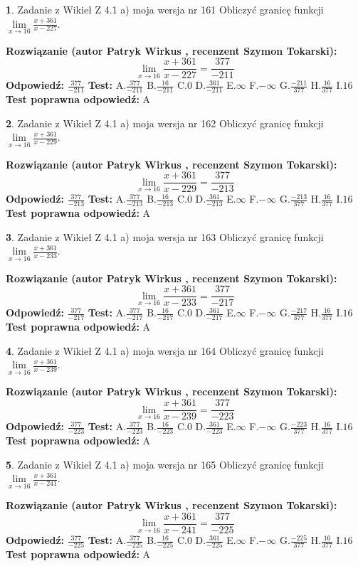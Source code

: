 \documentclass[12pt, a4paper]{article}
\theoremstyle{definition} %
\newtheorem{zad}{}
\newcommand{\zadStart}[1]{\begin{zad}#1\newline}
\newcommand{\zadStop}{\end{zad}}
\newcommand{\rozwStart}[2]{\noindent \textbf{Rozwiązanie (autor #1 , recenzent #2): }\newline}
\newcommand{\rozwStop}{\newline}
\newcommand{\odpStart}{\noindent \textbf{Odpowiedź:}\newline}
\newcommand{\odpStop}{\newline}
\newcommand{\testStart}{\noindent \textbf{Test:}\newline}
\newcommand{\testStop}{\newline}
\newcommand{\kluczStart}{\noindent \textbf{Test poprawna odpowiedź:}\newline}
\newcommand{\kluczStop}{\newline}
\begin{document}
\zadStart{Zadanie z Wikieł Z 4.1 a) moja wersja nr 161}
Obliczyć granicę funkcji $\lim\limits_{x\to16}\frac{x+361}{x-227}$.
\zadStop
\rozwStart{Patryk Wirkus}{Szymon Tokarski}
$$\lim\limits_{x\to16}\frac{x+361}{x-227} = \frac{377}{-211}$$
\rozwStop
\odpStart
$\frac{377}{-211}$
\odpStop
\testStart
A.$\frac{377}{-211}$
B.$\frac{16}{-211}$
C.$0$
D.$\frac{361}{-211}$
E.$\infty$
F.$-\infty$
G.$\frac{-211}{377}$
H.$\frac{16}{377}$
I.$16$
\testStop
\kluczStart
A
\kluczStop



\zadStart{Zadanie z Wikieł Z 4.1 a) moja wersja nr 162}
Obliczyć granicę funkcji $\lim\limits_{x\to16}\frac{x+361}{x-229}$.
\zadStop
\rozwStart{Patryk Wirkus}{Szymon Tokarski}
$$\lim\limits_{x\to16}\frac{x+361}{x-229} = \frac{377}{-213}$$
\rozwStop
\odpStart
$\frac{377}{-213}$
\odpStop
\testStart
A.$\frac{377}{-213}$
B.$\frac{16}{-213}$
C.$0$
D.$\frac{361}{-213}$
E.$\infty$
F.$-\infty$
G.$\frac{-213}{377}$
H.$\frac{16}{377}$
I.$16$
\testStop
\kluczStart
A
\kluczStop



\zadStart{Zadanie z Wikieł Z 4.1 a) moja wersja nr 163}
Obliczyć granicę funkcji $\lim\limits_{x\to16}\frac{x+361}{x-233}$.
\zadStop
\rozwStart{Patryk Wirkus}{Szymon Tokarski}
$$\lim\limits_{x\to16}\frac{x+361}{x-233} = \frac{377}{-217}$$
\rozwStop
\odpStart
$\frac{377}{-217}$
\odpStop
\testStart
A.$\frac{377}{-217}$
B.$\frac{16}{-217}$
C.$0$
D.$\frac{361}{-217}$
E.$\infty$
F.$-\infty$
G.$\frac{-217}{377}$
H.$\frac{16}{377}$
I.$16$
\testStop
\kluczStart
A
\kluczStop



\zadStart{Zadanie z Wikieł Z 4.1 a) moja wersja nr 164}
Obliczyć granicę funkcji $\lim\limits_{x\to16}\frac{x+361}{x-239}$.
\zadStop
\rozwStart{Patryk Wirkus}{Szymon Tokarski}
$$\lim\limits_{x\to16}\frac{x+361}{x-239} = \frac{377}{-223}$$
\rozwStop
\odpStart
$\frac{377}{-223}$
\odpStop
\testStart
A.$\frac{377}{-223}$
B.$\frac{16}{-223}$
C.$0$
D.$\frac{361}{-223}$
E.$\infty$
F.$-\infty$
G.$\frac{-223}{377}$
H.$\frac{16}{377}$
I.$16$
\testStop
\kluczStart
A
\kluczStop



\zadStart{Zadanie z Wikieł Z 4.1 a) moja wersja nr 165}
Obliczyć granicę funkcji $\lim\limits_{x\to16}\frac{x+361}{x-241}$.
\zadStop
\rozwStart{Patryk Wirkus}{Szymon Tokarski}
$$\lim\limits_{x\to16}\frac{x+361}{x-241} = \frac{377}{-225}$$
\rozwStop
\odpStart
$\frac{377}{-225}$
\odpStop
\testStart
A.$\frac{377}{-225}$
B.$\frac{16}{-225}$
C.$0$
D.$\frac{361}{-225}$
E.$\infty$
F.$-\infty$
G.$\frac{-225}{377}$
H.$\frac{16}{377}$
I.$16$
\testStop
\kluczStart
A
\kluczStop
\end{document}
